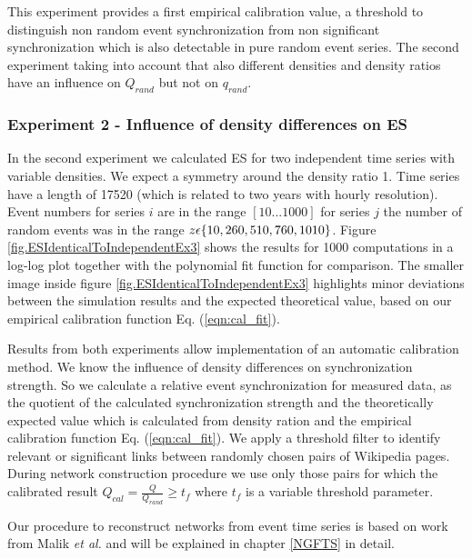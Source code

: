 \documentclass[a4paper,10pt]{scrbook}
\begin{document}
This experiment provides a first empirical calibration value, a threshold to distinguish non random event synchronization from non significant synchronization which is also detectable in pure random event series.
The second experiment taking into account that also different densities and density ratios have an influence on $Q_{rand}$ but not on $q_{rand}$.

\subsubsection*{Experiment 2 - Influence of density differences on ES}
In the second experiment we calculated ES for two independent time series with variable densities. We expect a symmetry around the density ratio 1. Time series have a length of 17520 (which is related to two years with hourly resolution). Event numbers for series $i$ are in the range $[10 ... 1000]$ for series $j$ the number of random events was in the range  $z \rm \epsilon \lbrace 10, 260, 510, 760, 1010 \rbrace $. Figure \ref{fig.ESIdenticalToIndependentEx3} shows the results for 1000 computations in a log-log plot together with the polynomial fit function for comparison. The smaller image inside figure \ref{fig.ESIdenticalToIndependentEx3} highlights minor deviations between the simulation results and the expected theoretical value, based on our empirical calibration function Eq. (\ref{eqn:cal_fit}).  

\label{ext.fig.ESIdenticalToIndependentEx3} 


Results from both experiments allow implementation of an automatic calibration method. We know the influence of density differences on synchronization strength. So we calculate a relative event synchronization for measured data, as the quotient of the calculated synchronization strength and the theoretically expected value which is calculated from density ration and the empirical calibration function Eq. (\ref{eqn:cal_fit}). We apply a threshold filter to identify relevant or significant links between randomly chosen pairs of Wikipedia pages. During network construction procedure we use only those pairs for which the calibrated result $Q_{cal}=\frac{Q}{Q_{rand}}\geq t_f$ where $t_f$ is a variable threshold parameter. 

Our procedure to reconstruct networks from event time series is based on work from Malik \textit{et al.} \cite{Malik2012} and will be explained in chapter \ref{NGFTS} in detail.
\end{document}
